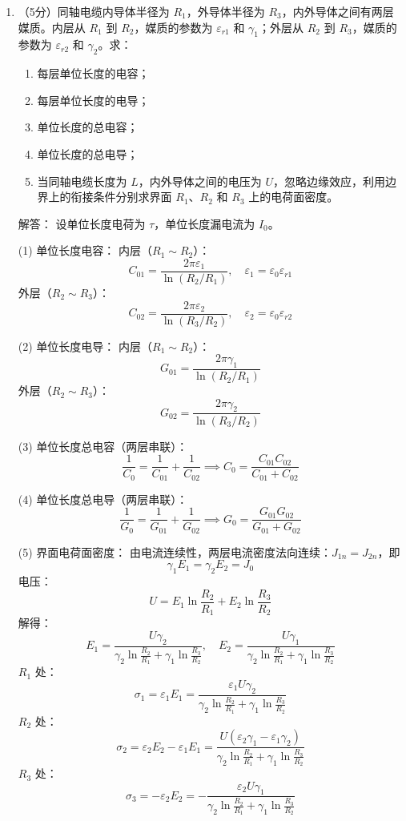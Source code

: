 \begin{enumerate}
(4) 绝缘电阻：
\[
R = \frac{U_0}{I} = \frac{1}{4\pi\gamma}\left(\frac{1}{R_1}-\frac{1}{R_2}\right)
\]
代入数值：
\[
R = \frac{1}{4\pi\times10^{-9}}\left(\frac{1}{0.05}-\frac{1}{0.1}\right) \approx 1.59\times10^9\,\Omega
\]

\item （5分）同轴电缆内导体半径为 $R_1$，外导体半径为 $R_3$，内外导体之间有两层媒质。内层从 $R_1$ 到 $R_2$，媒质的参数为 $\varepsilon_{r1}$ 和 $\gamma_1$；外层从 $R_2$ 到 $R_3$，媒质的参数为 $\varepsilon_{r2}$ 和 $\gamma_2$。求：
\begin{enumerate}
    \item 每层单位长度的电容；
    \item 每层单位长度的电导；
    \item 单位长度的总电容；
    \item 单位长度的总电导；
    \item 当同轴电缆长度为 $L$，内外导体之间的电压为 $U$，忽略边缘效应，利用边界上的衔接条件分别求界面 $R_1$、$R_2$ 和 $R_3$ 上的电荷面密度。
\end{enumerate}

解答：
设单位长度电荷为 $\tau$，单位长度漏电流为 $I_0$。

(1) 单位长度电容：
内层（$R_1\sim R_2$）：
\[
C_{01} = \frac{2\pi\varepsilon_1}{\ln(R_2/R_1)},\quad \varepsilon_1=\varepsilon_0\varepsilon_{r1}
\]
外层（$R_2\sim R_3$）：
\[
C_{02} = \frac{2\pi\varepsilon_2}{\ln(R_3/R_2)},\quad \varepsilon_2=\varepsilon_0\varepsilon_{r2}
\]

(2) 单位长度电导：
内层（$R_1\sim R_2$）：
\[
G_{01} = \frac{2\pi\gamma_1}{\ln(R_2/R_1)}
\]
外层（$R_2\sim R_3$）：
\[
G_{02} = \frac{2\pi\gamma_2}{\ln(R_3/R_2)}
\]

(3) 单位长度总电容（两层串联）：
\[
\frac{1}{C_0} = \frac{1}{C_{01}}+\frac{1}{C_{02}} \implies C_0 = \frac{C_{01}C_{02}}{C_{01}+C_{02}}
\]

(4) 单位长度总电导（两层串联）：
\[
\frac{1}{G_0} = \frac{1}{G_{01}}+\frac{1}{G_{02}} \implies G_0 = \frac{G_{01}G_{02}}{G_{01}+G_{02}}
\]

(5) 界面电荷面密度：
由电流连续性，两层电流密度法向连续：$J_{1n}=J_{2n}$，即
\[
\gamma_1 E_1 = \gamma_2 E_2 = J_0
\]
电压：
\[
U = E_1\ln\frac{R_2}{R_1} + E_2\ln\frac{R_3}{R_2}
\]
解得：
\[
E_1 = \frac{U\gamma_2}{\gamma_2\ln\frac{R_2}{R_1}+\gamma_1\ln\frac{R_3}{R_2}},\quad E_2 = \frac{U\gamma_1}{\gamma_2\ln\frac{R_2}{R_1}+\gamma_1\ln\frac{R_3}{R_2}}
\]
$R_1$ 处：
\[
\sigma_1 = \varepsilon_1 E_1 = \frac{\varepsilon_1 U\gamma_2}{\gamma_2\ln\frac{R_2}{R_1}+\gamma_1\ln\frac{R_3}{R_2}}
\]
$R_2$ 处：
\[
\sigma_2 = \varepsilon_2 E_2 - \varepsilon_1 E_1 = \frac{U(\varepsilon_2\gamma_1-\varepsilon_1\gamma_2)}{\gamma_2\ln\frac{R_2}{R_1}+\gamma_1\ln\frac{R_3}{R_2}}
\]
$R_3$ 处：
\[
\sigma_3 = -\varepsilon_2 E_2 = -\frac{\varepsilon_2 U\gamma_1}{\gamma_2\ln\frac{R_2}{R_1}+\gamma_1\ln\frac{R_3}{R_2}}
\]


\end{enumerate}
